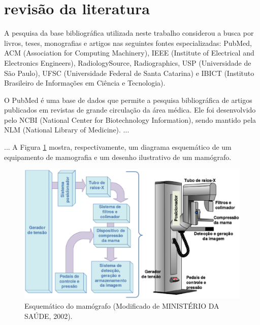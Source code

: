 \section[REVISÃO DA LITERATURA]{revisão da literatura}

A pesquisa da base bibliográfica utilizada neste trabalho considerou a busca por livros,
teses, monografias e artigos nas seguintes fontes especializadas: PubMed, ACM
(Association for Computing Machinery), IEEE (Institute of Electrical and Electronics
Engineers), RadiologySource, Radiographics, USP (Universidade de São Paulo), UFSC
(Universidade Federal de Santa Catarina) e IBICT (Instituto Brasileiro de Informações em
Ciência e Tecnologia).

O PubMed é uma base de dados que permite a pesquisa bibliográfica de artigos
publicados em revistas de grande circulação da área médica. Ele foi desenvolvido pelo
NCBI (National Center for Biotechnology Information), sendo mantido pela NLM
(National Library of Medicine). ...

...
A Figura \ref{esquematico} mostra, respectivamente, um diagrama esquemático de um equipamento de
mamografia e um desenho ilustrativo de um mamógrafo.

\begin{figure}[ht]
 \centering
 \includegraphics[scale=0.45]{figuras/fig1.eps}
 \caption{Esquemático do mamógrafo (Modificado de MINISTÉRIO DA SAÚDE, 2002).}
 \label{esquematico}
\end{figure}





